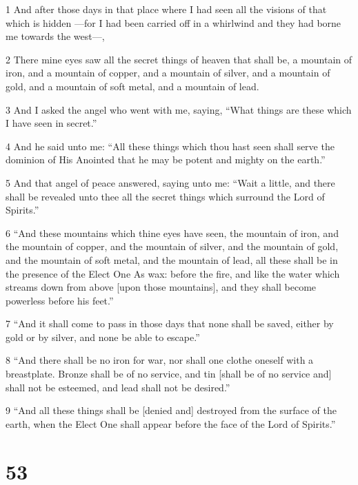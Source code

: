 \par 1 And after those days in that place where I had seen all the visions of that which is hidden —for I had been carried off in a whirlwind and they had borne me towards the west—,
\par 2 There mine eyes saw all the secret things of heaven that shall be, a mountain of iron, and a mountain of copper, and a mountain of silver, and a mountain of gold, and a mountain of soft metal, and a mountain of lead.
\par 3 And I asked the angel who went with me, saying, “What things are these which I have seen in secret.”
\par 4 And he said unto me: “All these things which thou hast seen shall serve the dominion of His Anointed that he may be potent and mighty on the earth.”
\par 5 And that angel of peace answered, saying unto me: “Wait a little, and there shall be revealed unto thee all the secret things which surround the Lord of Spirits.”
\par 6 “And these mountains which thine eyes have seen, the mountain of iron, and the mountain of copper, and the mountain of silver, and the mountain of gold, and the mountain of soft metal, and the mountain of lead, all these shall be in the presence of the Elect One As wax: before the fire, and like the water which streams down from above [upon those mountains], and they shall become powerless before his feet.”
\par 7 “And it shall come to pass in those days that none shall be saved, either by gold or by silver, and none be able to escape.”
\par 8 “And there shall be no iron for war, nor shall one clothe oneself with a breastplate. Bronze shall be of no service, and tin [shall be of no service and] shall not be esteemed, and lead shall not be desired.”
\par 9 “And all these things shall be [denied and] destroyed from the surface of the earth, when the Elect One shall appear before the face of the Lord of Spirits.”

\chapter{53}

